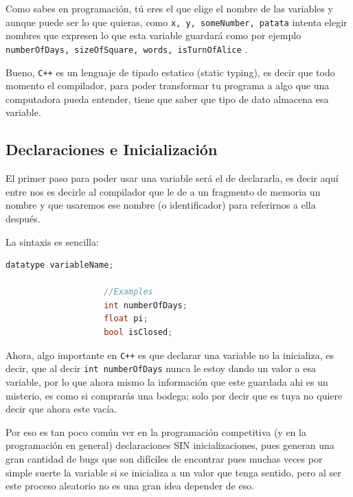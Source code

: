 \documentclass[12pt, fleqn]{report}                             %
\theoremstyle{break}                                            %
\newcommand{\textCode}[1]  { \texttt{#1} }                      %
\newcommand{\Cpp}{\ignorespaces\textCode{C++}}                  %
\begin{document}
            Como sabes en programación, tú eres el que elige el nombre de las variables y aunque puede
            ser lo que quieras, como \textCode{x, y, someNumber, patata} intenta elegir nombres que expresen
            lo que esta variable guardará como por ejemplo \textCode{numberOfDays, sizeOfSquare, words, isTurnOfAlice}. 

            Bueno, \Cpp es un lenguaje de tipado estatico (static typing), es decir que todo momento el compilador,
            para poder transformar tu programa a algo que una computadora pueda entender, tiene
            que saber que tipo de dato almacena esa variable.

            \subsection{Declaraciones e Inicialización}

                El primer paso para poder usar una variable será el de declararla, es decir
                aquí entre nos es decirle al compilador que le de a un fragmento de memoria 
                un nombre y que usaremos ese nombre (o identificador) para referirnos a ella después.

                La sintaxis es sencilla:
                \begin{lstlisting}[language=C++, gobble=20]
                    datatype variableName;

                    //Examples
                    int numberOfDays;
                    float pi;
                    bool isClosed;
                \end{lstlisting}

                Ahora, algo importante en \Cpp es que declarar una variable no la inicializa, 
                es decir, que al decir \textCode{int numberOfDays} nunca le estoy dando un valor a
                esa variable, por lo que ahora mismo la información que este guardada ahi es un misterio,
                es como si comprarás una bodega; solo por decir que es tuya no quiere decir que ahora este
                vacía.

                Por eso es tan poco común ver en la programación competitiva (y en la programación en general)
                declaraciones SIN inicializaciones,
                pues generan una gran cantidad de bugs que son difíciles de encontrar pues muchas veces
                por simple suerte la variable si se inicializa a un valor que tenga sentido, pero
                al ser este proceso aleatorio no es una gran idea depender de eso.
\end{document}
